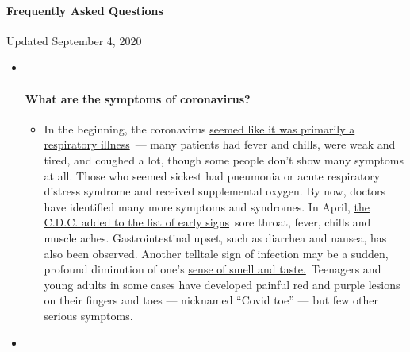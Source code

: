 \hypertarget{frequently-asked-questions}{%
\paragraph{Frequently Asked
Questions}\label{frequently-asked-questions}}

Updated September 4, 2020

\begin{itemize}
\item ~
  \hypertarget{what-are-the-symptoms-of-coronavirus}{%
  \paragraph{What are the symptoms of
  coronavirus?}\label{what-are-the-symptoms-of-coronavirus}}

  \begin{itemize}
  \tightlist
  \item
    In the beginning, the coronavirus
    \href{https://www.nytimes3xbfgragh.onion/article/coronavirus-facts-history.html?action=click\&pgtype=Article\&state=default\&region=MAIN_CONTENT_3\&context=storylines_faq\#link-6817bab5}{seemed
    like it was primarily a respiratory illness}~--- many patients had
    fever and chills, were weak and tired, and coughed a lot, though
    some people don't show many symptoms at all. Those who seemed
    sickest had pneumonia or acute respiratory distress syndrome and
    received supplemental oxygen. By now, doctors have identified many
    more symptoms and syndromes. In April,
    \href{https://www.nytimes3xbfgragh.onion/2020/04/27/health/coronavirus-symptoms-cdc.html?action=click\&pgtype=Article\&state=default\&region=MAIN_CONTENT_3\&context=storylines_faq}{the
    C.D.C. added to the list of early signs}~sore throat, fever, chills
    and muscle aches. Gastrointestinal upset, such as diarrhea and
    nausea, has also been observed. Another telltale sign of infection
    may be a sudden, profound diminution of one's
    \href{https://www.nytimes3xbfgragh.onion/2020/03/22/health/coronavirus-symptoms-smell-taste.html?action=click\&pgtype=Article\&state=default\&region=MAIN_CONTENT_3\&context=storylines_faq}{sense
    of smell and taste.}~Teenagers and young adults in some cases have
    developed painful red and purple lesions on their fingers and toes
    --- nicknamed ``Covid toe'' --- but few other serious symptoms.
  \end{itemize}
\item ~
  \hypertarget{why-is-it-safer-to-spend-time-together-outside}{%
}
\end{itemize}
